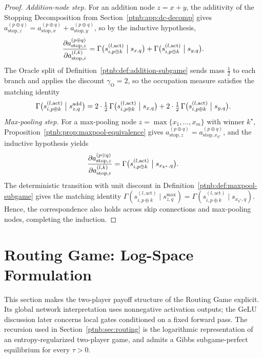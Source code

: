 \begin{proof}
\emph{Addition-node step.} For an addition node $z = x + y$, the additivity of the Stopping
Decomposition from Section~\ref{ptnb:app:dc-decomp} gives $a_{\mathrm{stop},z}^{(p \oplus q)} =
    a_{\mathrm{stop},x}^{(p \oplus q)} + a_{\mathrm{stop},y}^{(p \oplus q)}$, so by the inductive
hypothesis,
\begin{align}
    \frac{\partial a_{\mathrm{stop},z}^{(p \oplus q)}}{\partial a_{\mathrm{stop},i}^{(l, k)}}
    = \Gamma\bigl(s_{i, p \oplus k}^{(l, \mathrm{act})} \bigm| s_{x,q}\bigr) + \Gamma\bigl(s_{i, p
    \oplus k}^{(l, \mathrm{act})} \bigm| s_{y,q}\bigr).
\end{align}
The Oracle split of Definition~\ref{ptnb:def:addition-subgame} sends mass $\tfrac12$ to each branch and
applies the discount $\gamma_{\mathrm{O}} = 2$, so the occupation measure satisfies the matching
identity
\begin{align}
    \Gamma\bigl(s_{i, p \oplus k}^{(l, \mathrm{act})} \bigm| s_{z,q}^{\mathrm{add}}\bigr)
    = 2 \cdot \tfrac{1}{2}\, \Gamma\bigl(s_{i, p \oplus k}^{(l, \mathrm{act})} \bigm| s_{x,q}\bigr)
    + 2 \cdot \tfrac{1}{2}\, \Gamma\bigl(s_{i, p \oplus k}^{(l, \mathrm{act})} \bigm| s_{y,q}\bigr).
\end{align}
\emph{Max-pooling step.} For a max-pooling node $z = \max\{x_1, \dots, x_m\}$ with winner
$k^\star$, Proposition~\ref{ptnb:prop:maxpool-equivalence} gives $a_{\mathrm{stop},z}^{(p \oplus q)} =
    a_{\mathrm{stop},x_{k^\star}}^{(p \oplus q)}$, and the inductive hypothesis yields
\begin{align}
    \frac{\partial a_{\mathrm{stop},z}^{(p \oplus q)}}{\partial a_{\mathrm{stop},i}^{(l, k)}}
    = \Gamma\bigl(s_{i, p \oplus k}^{(l, \mathrm{act})} \bigm| s_{x_{k^\star},q}\bigr).
\end{align}
The deterministic transition with unit discount in Definition~\ref{ptnb:def:maxpool-subgame} gives the
matching identity $\Gamma(s_{i, p \oplus k}^{(l, \mathrm{act})} \mid s_{z,q}^{\max}) = \Gamma(s_{i,
    p \oplus k}^{(l, \mathrm{act})} \mid s_{x_{k^\star},q})$. Hence, the correspondence also holds
across skip connections and max-pooling nodes, completing the induction.
\end{proof}
\par\medskip
\section{Routing Game: Log-Space Formulation}\label{ptnb:app:routing-formal}

This section makes the two-player payoff structure of the Routing Game explicit. Its global network interpretation uses nonnegative activation outputs; the GeLU discussion later concerns local gates conditioned on a fixed forward pass. The recursion
used in Section~\ref{ptnb:sec:routing} is the logarithmic representation of an entropy-regularized
two-player game, and admits a Gibbs subgame-perfect equilibrium for every $\tau>0$.

